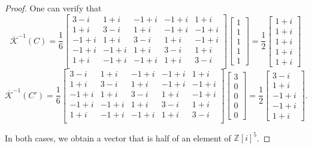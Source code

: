 \documentclass[12p]{amsart}
\numberwithin{equation}{section}
\theoremstyle{plain}
\theoremstyle{definition}
\begin{document}
\begin{proof}
    One can verify that 
    \begin{equation}\label{eq:half_proof}\overline{\mathcal K}^{-1}(C) = \frac 16\begin{bmatrix}
    3 - i & 1 + i & -1 + i & -1 + i & 1 + i \\
    1 + i & 3 - i & 1 + i & -1 + i & -1 + i \\
    -1 + i & 1 + i & 3 - i & 1 + i & -1 + i \\
    -1 + i & -1 + i & 1 + i & 3 - i & 1 + i \\
    1 + i & -1 + i & -1 + i & 1 + i & 3 - i \\
\end{bmatrix} \begin{bmatrix} 1 \\ 1 \\ 1 \\ 1 \\ 1\end{bmatrix}= \frac12\begin{bmatrix}1 + i\\ 1 + i\\ 1 + i\\ 1 + i\\ 1 + i\end{bmatrix}\end{equation}
\begin{equation}\label{eq:half_proof2}\overline{\mathcal K}^{-1}(C') = \frac 16\begin{bmatrix}
    3 - i & 1 + i & -1 + i & -1 + i & 1 + i \\
    1 + i & 3 - i & 1 + i & -1 + i & -1 + i \\
    -1 + i & 1 + i & 3 - i & 1 + i & -1 + i \\
    -1 + i & -1 + i & 1 + i & 3 - i & 1 + i \\
    1 + i & -1 + i & -1 + i & 1 + i & 3 - i \\
\end{bmatrix} \begin{bmatrix} 3 \\ 0 \\ 0 \\ 0 \\ 0\end{bmatrix}=\frac12\begin{bmatrix}3 -i\\ 1 + i\\ -1 + i\\ -1 + i\\ 1 + i\end{bmatrix}.\end{equation} 

In both cases, we obtain a vector that is half of an element of $\mathbb Z[i]^5$.  
\end{proof}
\end{document}
